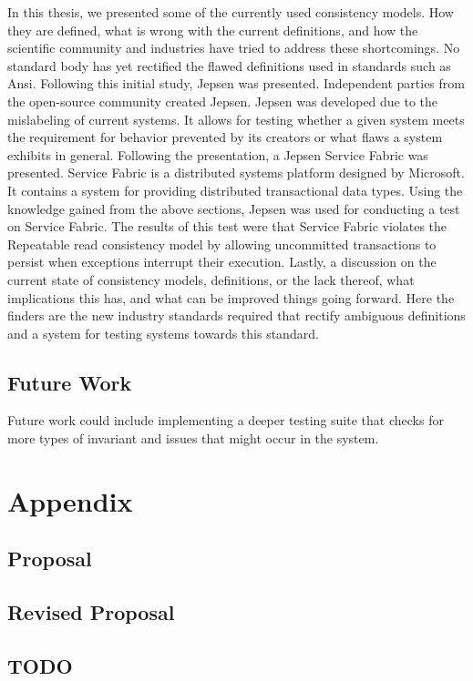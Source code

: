 \documentclass[a4paper,10pt,titlepage]{report}
\begin{document}
In this thesis, we presented some of the currently used consistency models. How they are defined, what is wrong with the current definitions, and how the scientific community and industries have tried to address these shortcomings. No standard body has yet rectified the flawed definitions used in standards such as Ansi\cite{ansi}. 
Following this initial study, Jepsen was presented. Independent parties from the open-source community created Jepsen. Jepsen was developed due to the mislabeling of current systems. It allows for testing whether a given system meets the requirement for behavior prevented by its creators or what flaws a system exhibits in general. 
Following the presentation, a Jepsen Service Fabric was presented. Service Fabric is a  distributed systems platform designed by Microsoft. It contains a system for providing distributed transactional data types. 
Using the knowledge gained from the above sections, Jepsen was used for conducting a test on Service Fabric. The results of this test were that Service Fabric violates the Repeatable read consistency model by allowing uncommitted transactions to persist when exceptions interrupt their execution. 
Lastly, a discussion on the current state of consistency models, definitions, or the lack thereof, what implications this has, and what can be improved things going forward. Here the finders are the new industry standards required that rectify ambiguous definitions and a system for testing systems towards this standard.



\section{Future Work}

Future work could include implementing a deeper testing suite that checks for more types of invariant and issues that might occur in the system.


\newpage
\chapter{Appendix}

\pagestyle{empty}
\printbibliography


\section{Proposal}


\section{Revised Proposal}


\section{TODO}
\todototoc
\listoftodos
\end{document}
